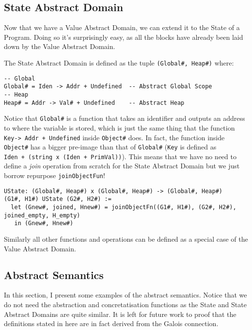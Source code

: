 \subsection{State Abstract Domain}\label{state-abstract-domain-1}

Now that we have a Value Abstract Domain, we can extend it to the State
of a Program. Doing so it's surprisingly easy, as all the blocks have
already been laid down by the Value Abstract Domain.

The State Abstract Domain is defined as the tuple
\texttt{(Global\#,\ Heap\#)} where:

\begin{verbatim}
-- Global
Global# = Iden -> Addr + Undefined  -- Abstract Global Scope
-- Heap
Heap# = Addr -> Val# + Undefined    -- Abstract Heap
\end{verbatim}

Notice that \texttt{Global\#} is a function that takes an identifier and
outputs an address to where the variable is stored, which is just the
same thing that the function
\texttt{Key-\textgreater{}\ Addr\ +\ Undefined} inside \texttt{Object\#}
does. In fact, the function inside \texttt{Object\#} has a bigger
pre-image than that of \texttt{Global\#} (\texttt{Key} is defined as
\texttt{Iden\ +\ (string\ x\ (Iden\ +\ PrimVal))}). This means that we
have no need to define a \emph{join} operation from scratch for the
State Abstract Domain but we just borrow repurpose
\texttt{joinObjectFun}!

\begin{verbatim}
UState: (Global#, Heap#) x (Global#, Heap#) -> (Global#, Heap#)
(G1#, H1#) UState (G2#, H2#) :=
  let (Gnew#, joined, Hnew#) = joinObjectFn((G1#, H1#), (G2#, H2#), joined_empty, H_empty)
   in (Gnew#, Hnew#)
\end{verbatim}

Similarly all other functions and operations can be defined as a special
case of the Value Abstract Domain.

\subsection{Abstract Semantics}\label{abstract-semantics-1}

In this section, I present some examples of the abstract semantics.
Notice that we do not need the abstraction and concretatisation
functions as the State and State Abstract Domains are quite similar. It
is left for future work to proof that the definitions stated in here are
in fact derived from the Galois connection.

